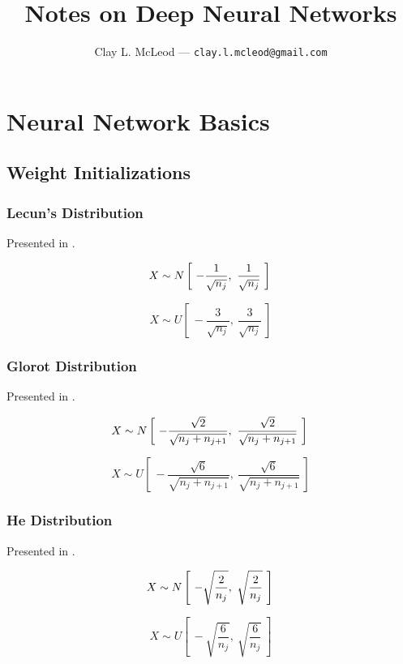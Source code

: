 \documentclass[12pt]{article}
\title{Notes on Deep Neural Networks}
\author{Clay L. McLeod --- \texttt{clay.l.mcleod@gmail.com}}
\begin{document}
\maketitle

\section{Neural Network Basics}
\subsection{Weight Initializations}

\subsubsection{Lecun's Distribution}

Presented in \cite[Sec 4.6]{efficient-backprop}.

\begin{equation}
    X \sim N \left[~-\frac{1}{\sqrt{n_{j}}},~\frac{1}{\sqrt{n_{j}}}~\right]\\
    \label{eq:lecun:normal}
\end{equation}


\begin{equation}
    X \sim U \left[~-\frac{3}{\sqrt{n_{j}}},~\frac{3}{\sqrt{n_{j}}}~\right]
    \label{eq:lecun:uniform}
\end{equation}

\subsubsection{Glorot Distribution}

Presented in \cite[4.2]{glorot10}.

\begin{equation}
    X \sim N \left[~-\frac{\sqrt{2}}{\sqrt{n_{j} + n_{j+1}}},~\frac{\sqrt{2}}{\sqrt{n_{j} + n_{j+1}}}~\right]\\
    \label{eq:glorot:normal}
\end{equation}

\begin{equation}
    X \sim U \left[~-\frac{\sqrt{6}}{\sqrt{n_{j} + n_{j+1}}},~\frac{\sqrt{6}}{\sqrt{n_{j} + n_{j+1}}}~\right]
    \label{eq:glorot:uniform}
\end{equation}

\subsubsection{He Distribution}

Presented in \cite[pg. 4]{he15}.

\begin{equation}
    X \sim N \left[~-\sqrt{\frac{2}{n_{j}}},~\sqrt{\frac{2}{n_{j}}}~\right]\\
    \label{eq:he:normal}
\end{equation}

\begin{equation}
    X \sim U \left[~-\sqrt{\frac{6}{n_{j}}},~\sqrt{\frac{6}{n_{j}}}~\right]
    \label{eq:he:uniform}
\end{equation}



\end{document}
